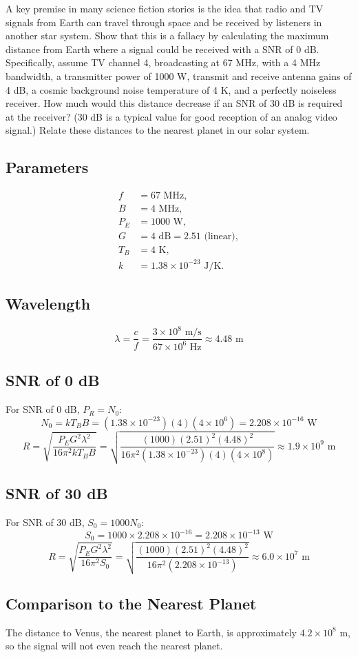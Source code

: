 \documentclass[cn,12pt]{homework}
\begin{document}
 A key premise in many science fiction stories is the idea that radio and TV signals from Earth
can travel through space and be received by listeners in another star system. Show that this is a fallacy by calculating the maximum distance from Earth where a signal could be received with a
SNR of 0 dB. Specifically, assume TV channel 4, broadcasting at 67 MHz, with a 4 MHz bandwidth, a transmitter power of 1000 W, transmit and receive antenna gains of 4 dB, a cosmic background noise temperature of 4 K, and a perfectly noiseless receiver. How much would this distance decrease if an SNR of 30 dB is required at the receiver? (30 dB is a typical value for good
reception of an analog video signal.) Relate these distances to the nearest planet in our solar
system.
\begin{solution}
  \subsection*{Parameters}
\begin{align*}
f &= 67 \text{ MHz}, \\
B &= 4 \text{ MHz}, \\
P_E &= 1000 \text{ W}, \\
G &= 4 \text{ dB} = 2.51 \text{ (linear)}, \\
T_B &= 4 \text{ K}, \\
k &= 1.38 \times 10^{-23} \text{ J/K}.
\end{align*}

\subsection*{Wavelength}
\[ \lambda = \frac{c}{f} = \frac{3 \times 10^8 \text{ m/s}}{67 \times 10^6 \text{ Hz}} \approx 4.48 \text{ m} \]

\subsection*{SNR of 0 dB}
For SNR of 0 dB, \( P_R = N_0 \):
\[ N_0 = k T_B B = (1.38 \times 10^{-23})(4)(4 \times 10^6) = 2.208 \times 10^{-16} \text{ W} \]
\[ R = \sqrt{\frac{P_E G^2 \lambda^2}{16 \pi^2 k T_B B}} = \sqrt{\frac{(1000)(2.51)^2 (4.48)^2}{16 \pi^2 (1.38 \times 10^{-23})(4)(4 \times 10^8)}} \approx 1.9 \times 10^9 \text{ m} \]

\subsection*{SNR of 30 dB}
For SNR of 30 dB, \( S_0 = 1000 N_0 \):
\[ S_0 = 1000 \times 2.208 \times 10^{-16} = 2.208 \times 10^{-13} \text{ W} \]
\[ R = \sqrt{\frac{P_E G^2 \lambda^2}{16 \pi^2 S_0}} = \sqrt{\frac{(1000)(2.51)^2 (4.48)^2}{16 \pi^2 (2.208 \times 10^{-13})}} \approx 6.0 \times 10^7 \text{ m} \]

\subsection*{Comparison to the Nearest Planet}
The distance to Venus, the nearest planet to Earth, is approximately \( 4.2 \times 10^8 \text{ m} \), so the signal will not even reach the nearest planet.
\end{solution}
\end{document}
